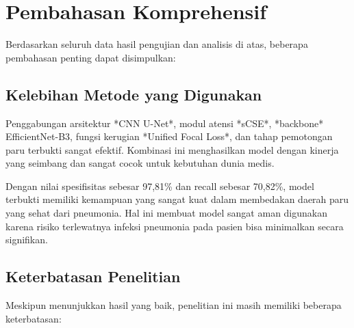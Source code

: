 \documentclass[12pt,a4paper,oneside]{book}
\begin{document}
\section{Pembahasan Komprehensif}

Berdasarkan seluruh data hasil pengujian dan analisis di atas, beberapa pembahasan penting dapat disimpulkan:

\subsection{Kelebihan Metode yang Digunakan}

Penggabungan arsitektur *CNN U-Net*, modul atensi *sCSE*, *backbone* EfficientNet-B3, fungsi kerugian *Unified Focal Loss*, dan tahap pemotongan paru terbukti sangat efektif. Kombinasi ini menghasilkan model dengan kinerja yang seimbang dan sangat cocok untuk kebutuhan dunia medis.

Dengan nilai spesifisitas sebesar 97,81\% dan recall sebesar 70,82\%, model terbukti memiliki kemampuan yang sangat kuat dalam membedakan daerah paru yang sehat dari pneumonia. Hal ini membuat model sangat aman digunakan karena risiko terlewatnya infeksi pneumonia pada pasien bisa minimalkan secara signifikan.

\subsection{Keterbatasan Penelitian}

Meskipun menunjukkan hasil yang baik, penelitian ini masih memiliki beberapa keterbatasan:
\end{document}

